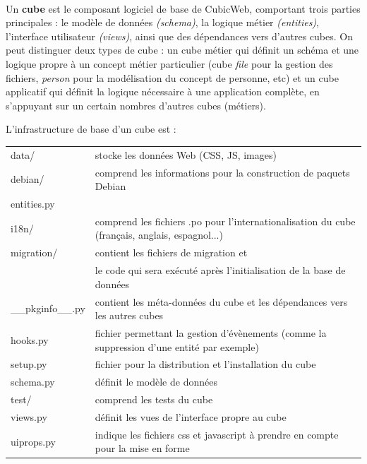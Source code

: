 \documentclass {report}
\begin{document}
\paragraph{}
Un \textbf{cube} est le composant logiciel de base de CubicWeb, comportant trois parties principales : le modèle de données \textit{(schema)}, la logique métier \textit{(entities)}, l’interface utilisateur \textit{(views)}, ainsi que des dépendances vers d’autres cubes. On peut distinguer deux types de cube : un cube métier qui définit un schéma et une logique propre à un concept métier particulier (cube \textit{file} pour la gestion des fichiers, \textit{person} pour la modélisation du concept de personne, etc) et un cube applicatif qui définit la logique nécessaire à une application complète, en s'appuyant sur un certain nombres d’autres cubes (métiers).
    \begin{center}
    L’infrastructure de base d’un cube est : \\
    \end{center}
\begin{tabular}{|l|l|}
\hline
data/ & stocke les données Web (CSS, JS, images)\\
debian/ & comprend les informations pour la construction de paquets Debian\\
entities.py &\\
i18n/ & comprend les fichiers .po pour l'internationalisation du cube (français, anglais, espagnol...)\\
migration/ & contient les fichiers de migration et \\
           & le code qui sera exécuté après l'initialisation de la base de données\\
\_\_pkginfo\_\_.py & contient les méta-données du cube et les dépendances vers les autres cubes\\
hooks.py & fichier permettant la gestion d'évènements (comme la suppression d'une entité par exemple)\\
setup.py & fichier pour la distribution et l'installation du cube\\
schema.py & définit le modèle de données\\
test/ & comprend les tests du cube\\
views.py & définit les vues de l'interface propre au cube\\
uiprops.py & indique les fichiers css et javascript à prendre en compte pour la mise en forme\\
\hline
\end{tabular}
\end{document}
